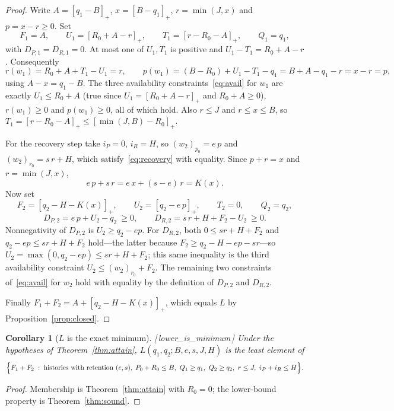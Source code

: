 \documentclass[11pt]{article}
\theoremstyle{plain}
\newtheorem{corollary}[theorem]{Corollary}
\theoremstyle{definition}
\theoremstyle{remark}
\newcommand{\pos}[1]{\left[#1\right]_{+}}
\newcommand{\leanref}[1]{{\normalfont\sffamily\footnotesize[\,#1\,]}}
\newcommand{\Lc}{L}
\begin{document}
\begin{proof}
Write $A=\pos{q_1-B}$, $x=\pos{B-q_1}$, $r=\min(J,x)$ and $p=x-r\ge0$. Set
\[
 F_1=A,\qquad U_1=\pos{R_0+A-r},\qquad T_1=\pos{r-R_0-A},
 \qquad Q_1=q_1,
\]
with $D_{P,1}=D_{R,1}=0$. At most one of $U_1,T_1$ is positive and
$U_1-T_1=R_0+A-r$. Consequently
\[
 r(w_1)=R_0+A+T_1-U_1=r,\qquad
 p(w_1)=(B-R_0)+U_1-T_1-q_1=B+A-q_1-r=x-r=p ,
\]
using $A-x=q_1-B$. The three availability
constraints~\eqref{eq:avail} for $w_1$ are exactly $U_1\le R_0+A$ (true since
$U_1=\pos{R_0+A-r}$ and $R_0+A\ge0$), $r(w_1)\ge0$ and $p(w_1)\ge0$, all of
which hold. Also $r\le J$ and $r\le x\le B$, so
$T_1=\pos{r-R_0-A}\le\pos{\min(J,B)-R_0}$.

For the recovery step take $i_P=0$, $i_R=H$, so
$(w_2)_{p_0}=e\,p$ and $(w_2)_{r_0}=s\,r+H$, which satisfy~\eqref{eq:recovery}
with equality. Since $p+r=x$ and $r=\min(J,x)$,
\[
 e\,p+s\,r=e\,x+(s-e)\,r=K(x).
\]
Now set
\[
 F_2=\pos{q_2-H-K(x)},\qquad
 U_2=\pos{q_2-e\,p},\qquad T_2=0,\qquad Q_2=q_2,
\]
\[
 D_{P,2}=e\,p+U_2-q_2\ \ge 0,\qquad
 D_{R,2}=s\,r+H+F_2-U_2\ \ge 0 .
\]
Nonnegativity of $D_{P,2}$ is $U_2\ge q_2-ep$. For $D_{R,2}$, both
$0\le sr+H+F_2$ and $q_2-ep\le sr+H+F_2$ hold---the latter because
$F_2\ge q_2-H-ep-sr$---so $U_2=\max(0,q_2-ep)\le sr+H+F_2$; this same
inequality is the third availability constraint $U_2\le (w_2)_{r_0}+F_2$. The
remaining two constraints of~\eqref{eq:avail} for $w_2$ hold with equality by
the definition of $D_{P,2}$ and $D_{R,2}$.

Finally $F_1+F_2=A+\pos{q_2-H-K(x)}$, which equals $\Lc$ by
Proposition~\ref{prop:closed}.
\end{proof}

\begin{corollary}[$\Lc$ is the exact minimum]\label{cor:least}
\leanref{lower\_is\_minimum}
Under the hypotheses of Theorem~\ref{thm:attain}, $\Lc(q_1,q_2;B,e,s,J,H)$ is
the least element of
\[
 \Bigl\{F_1+F_2 \;:\; \text{histories with retention }(e,s),\;
 P_0+R_0\le B,\ Q_1\ge q_1,\ Q_2\ge q_2,\ r\le J,\ i_P+i_R\le H\Bigr\}.
\]
\end{corollary}

\begin{proof}
Membership is Theorem~\ref{thm:attain} with $R_0=0$; the lower-bound property
is Theorem~\ref{thm:sound}.
\end{proof}
\end{document}
